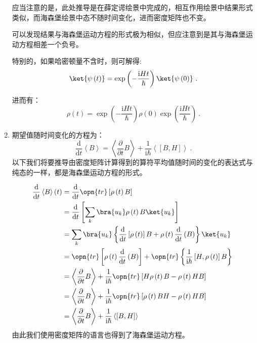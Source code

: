 \begin{enumerate}
    应当注意的是，此处推导是在薛定谔绘景中完成的，相互作用绘景中结果形式类似，而海森堡绘景中态不随时间变化，进而密度矩阵也不变。

    可以发现结果与海森堡运动方程的形式极为相似，但应注意到是其与海森堡运动方程相差一个负号。

    特别的，如果哈密顿量不含时，则可解得:
    $$\ket{\psi\left( t\right)} = \exp\left(-\frac{\mathrm{i}Ht}{\hbar}\right)\ket{\psi\left(0\right)}~.$$

    进而有：
    \begin{equation}\label{eq_denMat_6}
    \rho \left( t \right) = \exp\left(-\frac{\mathrm{i}Ht}{\hbar}\right) \rho \left(0\right) \exp\left(\frac{\mathrm{i}Ht}{\hbar}\right)~.
    \end{equation}
    
\item 期望值随时间变化的方程为：
    \begin{equation}
    \frac{\mathrm{d}}{\mathrm{d}t}\left\langle B \right\rangle = \left\langle \frac{\partial}{\partial t} B \right\rangle + \frac{1}{\mathrm{i}\hbar}\left\langle \left[ B, H \right]\right\rangle~.
    \end{equation}
    以下我们将要推导由密度矩阵计算得到的算符平均值随时间的变化的表达式与纯态的一样，都是海森堡运动方程的形式。
    
    \begin{equation}\label{eq_denMat_11}
    \begin{aligned}
    \frac{\mathrm{d}}{\mathrm{d}t}\left\langle B \right\rangle \left( t \right) &= \frac{\mathrm{d}}{\mathrm{d}t}\opn{tr}\left[\rho\left(t\right)B\right] \\
    &=\frac{\mathrm{d}}{\mathrm{d}t}\left[ \sum\limits_k \bra{u_k}\rho\left(t\right)B\ket{u_k}     \right] \\
    &= \sum\limits_k\bra{u_k}\left\{ \frac{\mathrm{d}}{\mathrm{d} t}\left[\rho \left(t\right)\right]B + \rho\left(t\right)\frac{\mathrm{d}}{\mathrm{d}t}\left( B\right) \right\}\ket{u_k} \\
    &=\opn{tr}\left[ \rho\left(t\right)\frac{\mathrm{d}}{\mathrm{d}t}\left(B\right) \right] + \opn{tr}\left\{\frac{1}{\mathrm{i}\hbar}\left[H,\rho\left(t\right)\right]B\right\} \\
    &=\left\langle \frac{\partial}{\partial t} B \right\rangle + \frac{1}{\mathrm{i}\hbar}\opn{tr}\left[H\rho\left(t\right)B - \rho\left(t\right)HB\right] \\
    &=\left\langle \frac{\partial}{\partial t}B\right\rangle + \frac{1}{\mathrm{i}\hbar}\opn{tr}\left[\rho\left(t\right)BH - \rho \left(t\right)HB\right] \\
    &=\left\langle\frac{\partial}{\partial t}B\right\rangle + \frac{1}{\mathrm{i}\hbar}\left\langle\left[B,H\right]\right\rangle
    \end{aligned}~
    \end{equation}
    由此我们使用密度矩阵的语言也得到了海森堡运动方程。



\end{enumerate}
